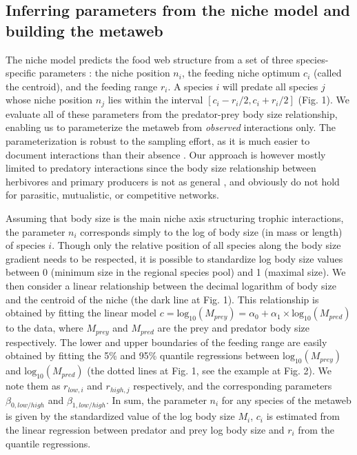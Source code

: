 \documentclass[12pt]{article}
\begin{document}
\subsection{Inferring parameters from the niche model and building the metaweb}

The niche model predicts the food web structure from a set of three
species-specific parameters \parencite{Williams2000}: the niche position $n_i$, the feeding niche optimum
$c_i$ (called the centroid), and the feeding range $r_i$. A species $i$ will
predate all species $j$ whose niche position $n_j$ lies within the interval
$[c_i-r_i/2,c_i+r_i/2]$ (Fig. 1). We evaluate all of these parameters from the
predator-prey body size relationship, enabling us to parameterize the metaweb
from \emph{observed} interactions only. The parameterization is robust to the
sampling effort, as it is much easier to document interactions than their
absence \parencite{Martinez1999}. Our approach is however mostly limited to
predatory interactions since the body size relationship between herbivores and
primary producers is not as general \parencite{Riede2010}, and obviously do not
hold for parasitic, mutualistic, or competitive networks. 

Assuming that body size is the main niche axis structuring trophic interactions,
the parameter $n_i$ corresponds simply to the log of body size (in mass or
length) of species $i$. Though only the relative position of all species along
the body size gradient needs to be respected, it is possible to standardize log
body size values between 0 (minimum size in the regional species pool) and 1
(maximal size). We then consider a linear relationship between the decimal
logarithm of body size and the centroid of the niche (the dark line at Fig. 1).
This relationship is obtained by fitting the linear model $c =
\mathrm{log}_{10}(M_{prey})=\alpha_0 +
\alpha_1\times\mathrm{log}_{10}(M_{pred})$ to the data, where $M_{prey}$ and
$M_{pred}$ are the prey and predator body size respectively. The lower and upper
boundaries of the feeding range are easily obtained by fitting the 5\% and 95\%
quantile regressions between $\mathrm{log}_{10}(M_{prey})$ and
$\mathrm{log}_{10}(M_{pred})$ (the dotted lines at Fig. 1, see the example at Fig.
2). We note them as $r_{low,i}$ and $r_{high,j}$ respectively, and the
corresponding parameters $\beta_{0,low/high}$ and $\beta_{1,low/high}$.  In sum,
the parameter $n_i$ for any species of the metaweb is given by the standardized
value of the log body size $M_i$, $c_i$ is estimated from the linear regression
between predator and prey log body size and $r_i$ from the quantile regressions. 
\end{document}
